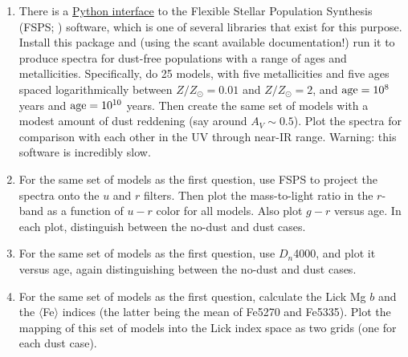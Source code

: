 \begin{enumerate}
\item There is
a \href{https://python-fsps.readthedocs.io/en/latest/installation/}{Python
interface} to the Flexible Stellar Population Synthesis
(FSPS; \citealt{conroy09a}) software, which is one of several
libraries that exist for this purpose. Install this package and (using
the scant available documentation!) run it to produce spectra for
dust-free populations with a range of ages and
metallicities. Specifically, do 25 models, with five metallicities and
five ages spaced logarithmically between $Z/Z_\odot = 0.01$ and
$Z/Z_\odot = 2$, and ${\rm age} = 10^8$ years and ${\rm age} =
10^{10}$ years. Then create the same set of models with a modest
amount of dust reddening (say around $A_V \sim 0.5$). Plot the spectra
for comparison with each other in the UV through near-IR
range. Warning: this software is incredibly slow.
\item For the same set of models as the first question, use FSPS to
project the spectra onto the $u$ and $r$ filters. Then plot the
mass-to-light ratio in the $r$-band as a function of $u-r$ color for
all models.  Also plot $g-r$ versus age. In each plot, distinguish
between the no-dust and dust cases.
\item For the same set of models as the first question, use $D_n$4000,
and plot it versus age, again distinguishing between the no-dust and
dust cases.
\item For the same set of models as the first question, calculate
the Lick Mg $b$ and the $\langle$Fe$\rangle$ indices (the latter being
the mean of Fe5270 and Fe5335). Plot the mapping of this set
of models into the Lick index space as two grids (one for each dust
case). 
\end{enumerate}


  
